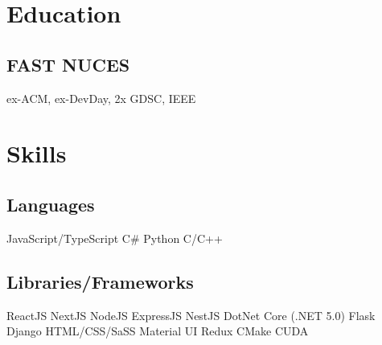 \documentclass[]{openfont}
\begin{document}
%
%
\lastupdated

%
%

%
%

\begin{minipage}[t]{0.33\textwidth} 


\section{Education} 

\subsection{FAST NUCES}
ex-ACM, ex-DevDay, 2x GDSC, IEEE
\sectionsep


\section{Skills}

\subsection{Languages}
JavaScript/TypeScript \textbullet{} C\# \textbullet{} Python \textbullet{} C/C++
\sectionsep

\subsection{Libraries/Frameworks}
ReactJS \textbullet{} NextJS \textbullet{} NodeJS \textbullet{} ExpressJS \textbullet{} NestJS \textbullet{} DotNet Core (.NET 5.0) \textbullet{} Flask \textbullet{} Django \textbullet{} HTML/CSS/SaSS \textbullet{} Material UI \textbullet{} Redux \textbullet{} CMake \textbullet{} CUDA
\sectionsep 


\end{minipage}
\end{document}
